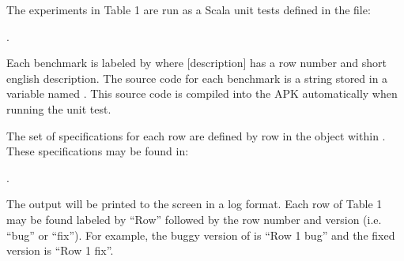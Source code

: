 \documentclass{article} %
\begin{document}
The experiments in Table 1 are run as a Scala unit tests defined in the file: 

.  

Each benchmark is labeled by  where [description] has a row number and short english description.
The source code for each benchmark is a string stored in a variable named .
This source code is compiled into the APK automatically when running the unit test.

The set of \newls specifications for each row are defined by row in the  object within .  These specifications may be found in:

\begin{center}
.
\end{center}

The output will be printed to the screen in a log format.  Each row of Table 1 may be found labeled by ``Row'' followed by the row number and version (i.e. ``bug'' or ``fix'').  For example, the buggy version of \apGa is ``Row 1 bug'' and the fixed version is ``Row 1 fix''.  

\newcommand{\cTimeout}{\showclock{0}{45}}
\newsavebox{\cSafeBox}
\newcommand{\cSafe}{
\usebox{\cSafeBox}
}

\newsavebox{\cSafeToFiveBox}
\newcommand{\cSafeToFive}{
\usebox{\cSafeToFiveBox}
}

\newsavebox{\cAlarmBox}
\newcommand{\cAlarm}{\usebox{\cAlarmBox}}
%
\end{document}
